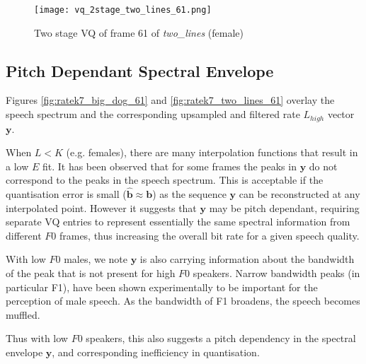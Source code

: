 \documentclass{article}
\begin{document}
\begin{figure}[h]
\caption{Two stage VQ of frame 61 of \emph{two\_lines} (female) }
\label{fig:vq_2stage_two_lines_61}
\begin{center}
\texttt{[image: vq\_2stage\_two\_lines\_61.png]}
\end{center}
\end{figure}

\FloatBarrier

\subsection{Pitch Dependant Spectral Envelope}

Figures \ref{fig:ratek7_big_dog_61} and \ref{fig:ratek7_two_lines_61} overlay the speech spectrum and the corresponding upsampled and filtered rate $L_{high}$ vector $\mathbf{y}$.

When $L<K$ (e.g. females), there are many interpolation functions that result in a low $E$ fit.  It has been observed that for some frames the peaks in $\mathbf{y}$ do not correspond to the peaks in the speech spectrum.  This is acceptable if the quantisation error is small ($\hat{\mathbf{b}}\approx\mathbf{b}$) as the sequence $\mathbf{y}$ can be reconstructed at any interpolated point.  However it suggests that $\mathbf{y}$ may be pitch dependant, requiring separate VQ entries to represent essentially the same spectral information from different $F0$ frames, thus increasing the overall bit rate for a given speech quality.

With low $F0$ males, we note $\mathbf{y}$ is also carrying information about the bandwidth of the peak that is not present for high $F0$ speakers. Narrow bandwidth peaks (in particular F1), have been shown experimentally to be important for the perception of male speech.  As the bandwidth of F1 broadens, the speech becomes muffled.

Thus with low $F0$ speakers, this also suggests a pitch dependency in the spectral envelope $\mathbf{y}$, and corresponding inefficiency in quantisation.
\end{document}
